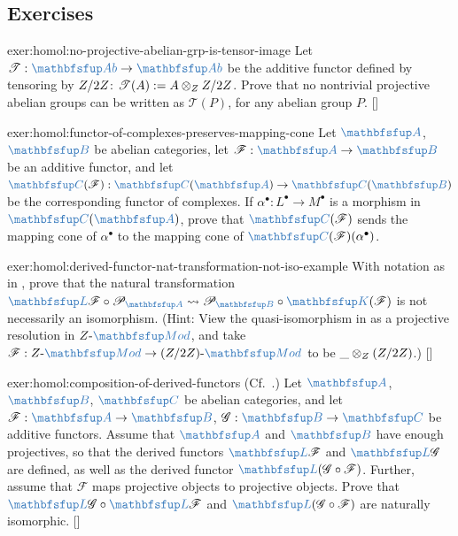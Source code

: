 \subsection*{Exercises}

\begin{exer}{\exerused{}}{exer:homol:no-projective-abelian-grp-is-tensor-image}
  Let $\mathscr{T} : \categ{Ab} \to \categ{Ab}$ be the additive
  functor defined by tensoring by $Z/2Z$:
  $\mathscr{T}(A) := A \otimes_{Z} Z/2Z$. Prove that no nontrivial
  projective abelian groups can be written as $\mathscr{T}(P)$, for
  any abelian group $P$. []
\end{exer}
\begin{exer}{}{exer:homol:functor-of-complexes-preserves-mapping-cone}
  Let $\categ{A}$, $\categ{B}$ be abelian categories, let
  $\mathscr{F} : \categ{A} \to \categ{B}$ be an additive functor, and
  let
  $\categ{C}(\mathscr{F}) : \categ{C}(\categ{A}) \to
  \categ{C}(\categ{B})$ be the corresponding functor of complexes.  If
  $\alpha^\bullet : L^\bullet \to M^\bullet$ is a morphism in
  $\categ{C}(\categ{A})$, prove that $\categ{C}(\mathscr{F})$ sends
  the mapping cone of $\alpha^\bullet$ to the mapping cone of
  $\categ{C}(\mathscr{F})(\alpha^\bullet)$.
\end{exer}
\begin{exer}{\exerused{}}{exer:homol:derived-functor-nat-transformation-not-iso-example}
  With notation as in , prove that the natural
  transformation
  $\categ{L}\mathscr{F} \circ \mathscr{P}_{\categ{A}} \rightsquigarrow
  \mathscr{P}_{\categ{B}} \circ \categ{K}(\mathscr{F})$ is not
  necessarily an isomorphism. (Hint: View the quasi-isomorphism in
   as a projective resolution in
  $\Z\text{-}\categ{Mod}$, and take
  $\mathscr{F} : \Z\text{-}\categ{Mod} \to
  (\Z/2\Z)\text{-}\categ{Mod}$ to be $\_\otimes_{Z} (Z/2Z)$.)
  []
\end{exer}
\begin{exer}{\exerused{}}{exer:homol:composition-of-derived-functors}
  (Cf.\ .) Let $\categ{A}$, $\categ{B}$,
  $\categ{C}$ be abelian categories, and let
  $\mathscr{F} : \categ{A} \to \categ{B}$,
  $\mathscr{G} : \categ{B} \to \categ{C}$ be additive functors. Assume
  that $\categ{A}$ and $\categ{B}$ have enough projectives, so that
  the derived functors $\categ{L}\mathscr{F}$ and
  $\categ{L}\mathscr{G}$ are defined, as well as the derived functor
  $\categ{L}(\mathscr{G} \circ \mathscr{F})$. Further, assume that
  $\mathscr{F}$ maps projective objects to projective objects. Prove
  that $\categ{L}\mathscr{G} \circ \categ{L}\mathscr{F}$ and
  $\categ{L}(\mathscr{G} \circ \mathscr{F})$ are naturally
  isomorphic. []
\end{exer}
